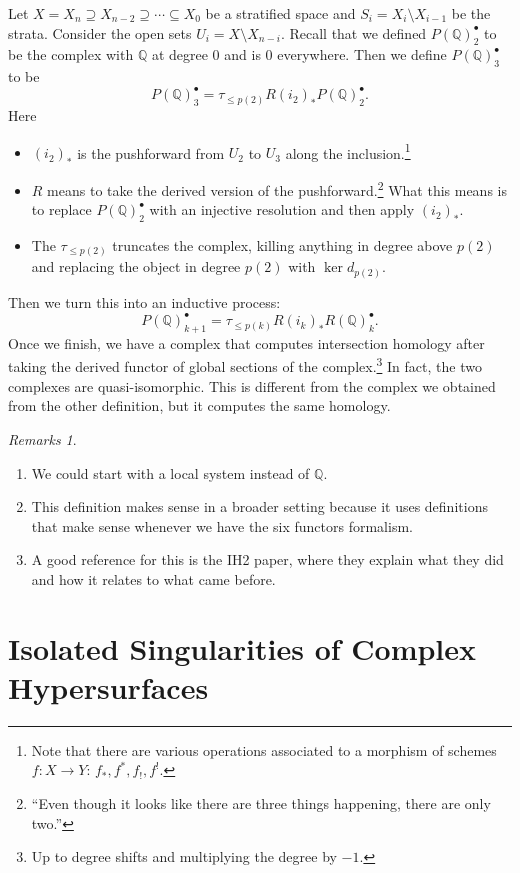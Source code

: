 \documentclass[leqno, openany]{memoir}
\theoremstyle{definition}
\theoremstyle{remark}
\newtheorem{rmks}[thm]{Remarks}
\theoremstyle{plain}
\theoremstyle{definition}
\theoremstyle{remark}
\newcommand{\Q}{\mathbb{Q}}
\begin{document}
Let $X = X_n \supseteq X_{n-2} \supseteq \cdots \subseteq X_0$ be a stratified
space and $S_i = X_i \setminus X_{i-1}$ be the strata. Consider the open sets
$U_i = X \setminus X_{n-i}$. Recall that we defined $P(\Q)_2^{\bullet}$ to be
the complex with $\Q$ at degree $0$ and is $0$ everywhere. Then we define
$P(\Q)_3^{\bullet}$ to be \[ P(\Q)_3^{\bullet} = \tau_{\leq p(2)} R (i_2)_*
P(\Q)_2^{\bullet}. \] Here \begin{itemize} \item $(i_2)_*$ is the pushforward
from $U_2$ to $U_3$ along the inclusion.\footnote{Note that there are various
operations associated to a morphism of schemes $f:X \to Y$: $f_*, f^*, f_!,
f^!$.} \item $R$ means to take the derived version of the
pushforward.\footnote{``Even though it looks like there are three things
happening, there are only two.''} What this means is to replace
$P(\Q)_2^{\bullet}$ with an injective resolution and then apply $(i_2)_*$.
\item The $\tau_{\leq p(2)}$ truncates the complex, killing anything in degree
above $p(2)$ and replacing the object in degree $p(2)$ with $\ker d_{p(2)}$.
\end{itemize}

Then we turn this into an inductive process: \[ P(\Q)_{k+1}^{\bullet} =
\tau_{\leq p(k)} R (i_k)_* R(\Q)_k^{\bullet}. \] Once we finish, we have a
complex that computes intersection homology after taking the derived functor of
global sections of the complex.\footnote{Up to degree shifts and multiplying
the degree by $-1$.} In fact, the two complexes are quasi-isomorphic. This is
different from the complex we obtained from the other definition, but it
computes the same homology.

\begin{rmks} \begin{enumerate} \item We could start with a local system instead
    of $\Q$.  \item This definition makes sense in a broader setting because it
    uses definitions that make sense whenever we have the six functors
    formalism.  \item A good reference for this is the IH2 paper, where they
    explain what they did and how it relates to what came before.
    \end{enumerate} \end{rmks}

\section{Isolated Singularities of Complex Hypersurfaces}%
\label{sec:isolated_singularities_of_complex_hypersurfaces}
\end{document}

